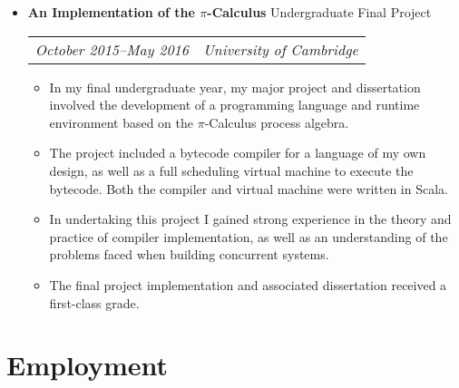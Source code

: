 \documentclass[letterpaper]{article}
\begin{document}
\begin{itemize}
    \item \textbf{An Implementation of the $\pi$-Calculus} Undergraduate Final
      Project \\
        \begin{tabular}{c|c}
            \emph{October 2015--May 2016} & \emph{University of Cambridge}
        \end{tabular}
        \begin{itemize}
            \item In my final undergraduate year, my major project and
              dissertation involved the development of a programming language
              and runtime environment based on the $\pi$-Calculus process
              algebra.

            \item The project included a bytecode compiler for a language of my
              own design, as well as a full scheduling virtual machine to
              execute the bytecode. Both the compiler and virtual machine were
              written in Scala.

            \item In undertaking this project I gained strong experience in the
              theory and practice of compiler implementation, as well as an
              understanding of the problems faced when building concurrent
              systems.

            \item The final project implementation and associated dissertation
              received a first-class grade.
        \end{itemize}
  \end{itemize}
\section*{Employment}
\end{document}
